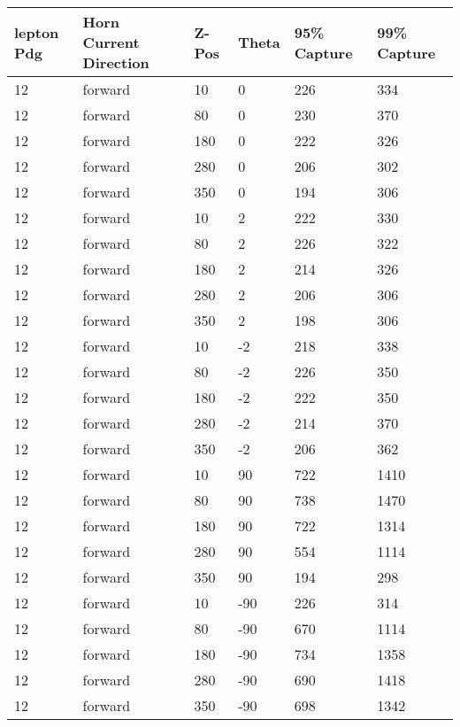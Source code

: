 \begin{table}
	\begin{center}
		\begin{tabular}{|l|l|l|l|l|l|}
			\hline
			lepton Pdg & Horn Current Direction & Z-Pos & Theta & 95\% Capture & 99\% Capture \\
			\hline
			12 & forward & 10 & 0 & 226 & 334 \\
			\hline
			12 & forward & 80 & 0 & 230 & 370 \\
			\hline
			12 & forward & 180 & 0 & 222 & 326 \\
			\hline
			12 & forward & 280 & 0 & 206 & 302 \\
			\hline
			12 & forward & 350 & 0 & 194 & 306 \\
			\hline
			12 & forward & 10 & 2 & 222 & 330 \\
			\hline
			12 & forward & 80 & 2 & 226 & 322 \\
			\hline
			12 & forward & 180 & 2 & 214 & 326 \\
			\hline
			12 & forward & 280 & 2 & 206 & 306 \\
			\hline
			12 & forward & 350 & 2 & 198 & 306 \\
			\hline
			12 & forward & 10 & -2 & 218 & 338 \\
			\hline
			12 & forward & 80 & -2 & 226 & 350 \\
			\hline
			12 & forward & 180 & -2 & 222 & 350 \\
			\hline
			12 & forward & 280 & -2 & 214 & 370 \\
			\hline
			12 & forward & 350 & -2 & 206 & 362 \\
			\hline
			12 & forward & 10 & 90 & 722 & 1410 \\
			\hline
			12 & forward & 80 & 90 & 738 & 1470 \\
			\hline
			12 & forward & 180 & 90 & 722 & 1314 \\
			\hline
			12 & forward & 280 & 90 & 554 & 1114 \\
			\hline
			12 & forward & 350 & 90 & 194 & 298 \\
			\hline
			12 & forward & 10 & -90 & 226 & 314 \\
			\hline
			12 & forward & 80 & -90 & 670 & 1114 \\
			\hline
			12 & forward & 180 & -90 & 734 & 1358 \\
			\hline
			12 & forward & 280 & -90 & 690 & 1418 \\
			\hline
			12 & forward & 350 & -90 & 698 & 1342 \\

\end{tabular}
\end{center}
\end{table}
